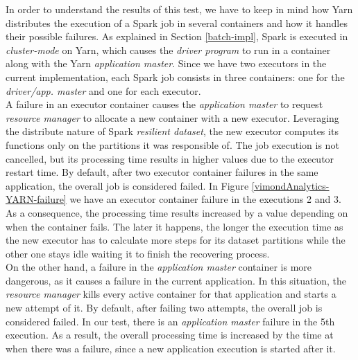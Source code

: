In order to understand the results of this test, we have to keep in mind how Yarn distributes the execution of a Spark job in several containers and how it handles their possible failures. As explained in Section \ref{batch-impl}, Spark is executed in \textit{cluster-mode} on Yarn, which causes the \textit{driver program} to run in a container along with the Yarn \textit{application master}. Since we have two executors in the current implementation, each Spark job consists in three containers: one for the \textit{driver/app. master} and one for each executor.\\
A failure in an executor container causes the \textit{application master} to request \textit{resource manager} to allocate a new container with a new executor. Leveraging the distribute nature of Spark \textit{resilient dataset}, the new executor computes its functions only on the partitions it was responsible of. The job execution is not cancelled, but its processing time results in higher values due to the executor restart time. By default, after two executor container failures in the same application, the overall job is considered failed. In Figure \ref{vimondAnalytics-YARN-failure} we have an executor container failure in the executions 2 and 3. As a consequence, the processing time results increased by a value depending on when the container fails. The later it happens, the longer the execution time as the new executor has to calculate more steps for its dataset partitions while the other one stays idle waiting it to finish the recovering process.\\
On the other hand, a failure in the \textit{application master} container is more dangerous, as it causes a failure in the current application. In this situation, the \textit{resource manager} kills every active container for that application and starts a new attempt of it. By default, after failing two attempts, the overall job is considered failed. In our test, there is an \textit{application master} failure in the 5th execution. As a result, the overall processing time is increased by the time at when there was a failure, since a new application execution is started after it.
